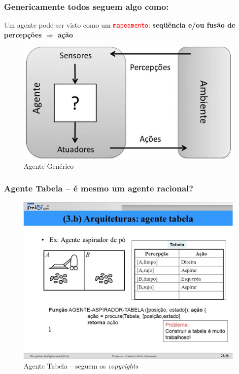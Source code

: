 
\begin{frame} %

    \frametitle{Genericamente todos seguem algo como:}

Um agente pode ser visto como um \textcolor{red}{\texttt{mapeamento}}: 
\textbf{seqüência e/ou fusão de percepções $\Rightarrow$  ação}

\begin{figure}[!ht]
  \centering
  \includegraphics[height =.5\textheight,width=.7\textwidth]{figuras/agente_generico.jpg}
  \caption{Agente Genérico}
\end{figure}
\end{frame}


\begin{frame} %

    \frametitle{Agente Tabela – é mesmo um agente racional?}

\begin{figure}[!ht]
  \centering
  \includegraphics[height =.6\textheight,width=.7\textwidth]{figuras/agente_tabela.jpg}
  \caption{Agente Tabela -- seguem os \textit{copyrights}}
\end{figure}

\end{frame}



